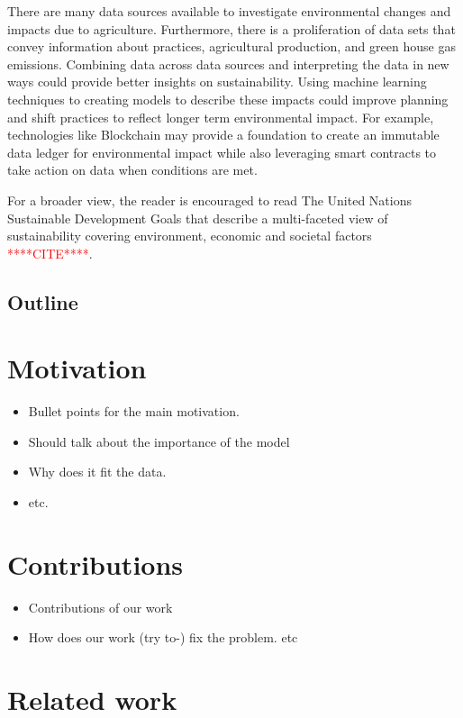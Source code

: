 \documentclass[11pt]{article}
\numberwithin{equation}{section}
\numberwithin{figure}{section}
\begin{document}
There are many data sources available to investigate environmental changes and impacts due to agriculture. Furthermore, there is a proliferation of data sets that convey information about practices, agricultural production, and green house gas emissions. Combining data across data sources and interpreting the data in new ways could provide better insights on sustainability. Using machine learning techniques to creating models to describe these impacts could improve planning and shift practices to reflect longer term environmental impact. For example, technologies like Blockchain may provide a foundation to create an immutable data ledger for environmental impact while also leveraging smart contracts to take action on data when conditions are met.

For a broader view, the reader is encouraged to read The United Nations Sustainable Development Goals that describe a multi-faceted view of sustainability covering environment, economic and societal factors \textcolor{red}{****CITE****}.

\subsection*{Outline}

\section{Motivation}
\begin{itemize}
\item Bullet points for the main motivation.
\item Should talk about the importance of the model
\item Why does it fit the data.

\item etc.
\end{itemize}
\section{Contributions}
\begin{itemize}
\item Contributions of our work
\item How does our work  (try to-) fix the problem. etc
\end{itemize}
\section{Related work}
\end{document}
